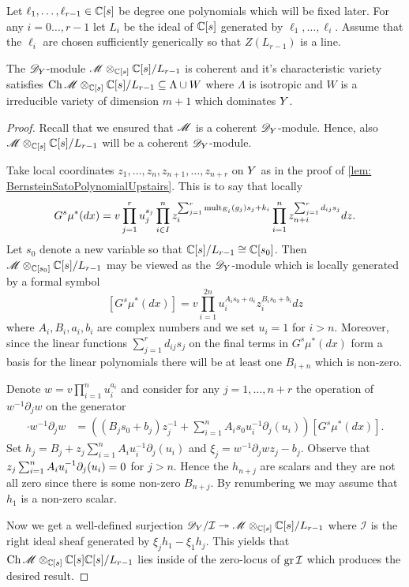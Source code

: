 Let $\ell_1,\ldots,\ell_{r-1}\in \mathbb{C}[s]$ be degree one polynomials which will be fixed later.
For any $i=0\ldots,r-1$ let $L_i$ be the ideal of $\mathbb{C}[s]$ generated by $\ell_1,\ldots,\ell_i$.
Assume that the $\ell_i$ are chosen sufficiently generically so that $Z(L_{r-1})$ is a line.
\begin{lemma}\label{lem: CharVarEstimateW}
  The $\mathscr{D}_Y$-module $\mathscr{M}\otimes_{\mathbb{C}[s]}\mathbb{C}[s]/L_{r-1}$ is coherent and it's characteristic variety satisfies $\operatorname{Ch}\mathscr{M}\otimes_{\mathbb{C}[s]}\mathbb{C}[s]/L_{r-1} \subseteq \Lambda \cup W $ where $\Lambda$ is isotropic and $W$ is a irreducible variety of dimension $m +1$ which dominates $Y$.
\end{lemma}
\begin{proof}
  Recall that we ensured that $\mathscr{M}$ is a coherent $\mathscr{D}_Y$-module.
  Hence, also $\mathscr{M}\otimes_{\mathbb{C}[s]}\mathbb{C}[s]/L_{r-1}$ will be a coherent $\mathscr{D}_Y$-module.

  Take local coordinates $z_1,\ldots,z_n,z_{n+1},\ldots,z_{n+r}$ on $Y$ as in the proof of \cref{lem: BernsteinSatoPolynomialUpstairs}.
  This is to say that locally
  $$G^s \mu^*(dx) = v\prod_{j=1}^r u_j^{s_j} \prod_{i\in I}^nz_i^{\sum_{j=1}^r \operatorname{mult}_{E_i}(g_j) s_j + k_i}\prod_{i=1}^n z_{n+i}^{\sum_{j=1}^r d_{ij}s_j} dz.$$
  Let $s_0$ denote a new variable so that $\mathbb{C}[s]/L_{r-1}\cong \mathbb{C}[s_0]$.
  Then $\mathscr{M}\otimes_{\mathbb{C}[s_0]}\mathbb{C}[s]/L_{r-1}$ may be viewed as the $\mathscr{D}_Y$-module which is locally generated by a formal symbol
  $$[G^s \mu^*(dx)] =v \prod_{i=1}^{2n} u_i^{A_i s_0 + a_i}z_i^{B_i s_0 + b_i} dz $$
  where $A_i,B_i,a_i,b_i$ are complex numbers and we set $u_{i}=1$ for $i>n$.
  Moreover, since the linear functions $\sum_{j=1}^r d_{ij}s_j$ on the final terms in $G^s\mu^*(dx)$ form a basis for the linear polynomials there will be at least one $B_{i+n}$ which is non-zero.

  Denote $w = v\prod_{i=1}^n u_i^{a_i}$ and consider for any $j=1,\ldots,n+r$ the operation of $w^{-1}\partial_j w$ on the generator
  \begin{align*}
    [G^s \mu^*(dx)]\cdot w^{-1}\partial_j w &=((B_j s_0 + b_j)z_j^{-1} + \sum_{i=1}^{n} A_i s_0 u_i^{-1}\partial_j(u_i) )[G^s \mu^*(dx)].
  \end{align*}
  Set $h_j = B_j + z_j\sum_{i=1}^n A_iu_i^{-1}\partial_j(u_i)$ and $\xi_j= w^{-1}\partial_j wz_j - b_j$.
  Observe that $ z_j\sum_{i=1}^n A_iu_i^{-1}\partial_j(u_i) \allowbreak= 0$ for $j>n$.
  Hence the $h_{n+j}$ are scalars and they are not all zero since there is some non-zero $B_{n+j}$.
  By renumbering we may assume that $h_1$ is a non-zero scalar.

  Now we get a well-defined surjection $\mathscr{D}_Y/\mathcal{I}\twoheadrightarrow \mathscr{M} \otimes_{\mathbb{C}[s]}\mathbb{C}[s]/L_{r-1}$ where $\mathcal{I}$ is the right ideal sheaf generated by $\xi_j h_1 - \xi_1 h_j$.
  This yields that $\operatorname{Ch} \mathscr{M}\otimes_{\mathbb{C}[s]}\mathbb{C}[s]\mathbb{C}[s]/L_{r-1}$ lies inside of the zero-locus of $\operatorname{gr} \mathcal{I}$ which produces the desired result.
\end{proof}
